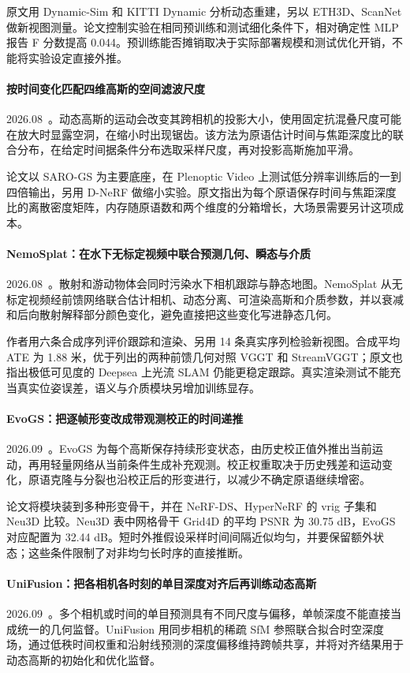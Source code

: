 原文用 Dynamic-Sim 和 KITTI Dynamic 分析动态重建，另以 ETH3D、ScanNet 做新视图测量。论文控制实验在相同预训练和测试细化条件下，相对确定性 MLP 报告 F 分数提高 0.044。预训练能否摊销取决于实际部署规模和测试优化开销，不能将实验设定直接外推。

\paragraph{按时间变化匹配四维高斯的空间滤波尺度}
2026.08~\cite{2608_21828}。动态高斯的运动会改变其跨相机的投影大小，使用固定抗混叠尺度可能在放大时显露空洞，在缩小时出现锯齿。该方法为原语估计时间与焦距深度比的联合分布，在给定时间据条件分布选取采样尺度，再对投影高斯施加平滑。

论文以 SARO-GS 为主要底座，在 Plenoptic Video 上测试低分辨率训练后的一到四倍输出，另用 D-NeRF 做缩小实验。原文指出为每个原语保存时间与焦距深度比的离散密度矩阵，内存随原语数和两个维度的分箱增长，大场景需要另计这项成本。

\paragraph{NemoSplat：在水下无标定视频中联合预测几何、瞬态与介质}
2026.08~\cite{2608_22888}。散射和游动物体会同时污染水下相机跟踪与静态地图。NemoSplat 从无标定视频经前馈网络联合估计相机、动态分离、可渲染高斯和介质参数，并以衰减和后向散射解释部分颜色变化，避免直接把这些变化写进静态几何。

作者用六条合成序列评价跟踪和渲染、另用 14 条真实序列检验新视图。合成平均 ATE 为 1.88 米，优于列出的两种前馈几何对照 VGGT 和 StreamVGGT；原文也指出极低可见度的 Deepsea 上光流 SLAM 仍能更稳定跟踪。真实渲染测试不能充当真实位姿误差，语义与介质模块另增加训练显存。

\paragraph{EvoGS：把逐帧形变改成带观测校正的时间递推}
2026.09~\cite{2609_00994}。EvoGS 为每个高斯保存持续形变状态，由历史校正值外推出当前运动，再用轻量网络从当前条件生成补充观测。校正权重取决于历史残差和运动变化，原语克隆与分裂也沿校正后的形变进行，以减少不确定原语继续增密。

论文将模块装到多种形变骨干，并在 NeRF-DS、HyperNeRF 的 vrig 子集和 Neu3D 比较。Neu3D 表中网格骨干 Grid4D 的平均 PSNR 为 30.75 dB，EvoGS 对应配置为 32.44 dB。短时外推假设采样时间间隔近似均匀，并要保留额外状态；这些条件限制了对非均匀长时序的直接推断。

\paragraph{UniFusion：把各相机各时刻的单目深度对齐后再训练动态高斯}
2026.09~\cite{2609_05888}。多个相机或时间的单目预测具有不同尺度与偏移，单帧深度不能直接当成统一的几何监督。UniFusion 用同步相机的稀疏 SfM 参照联合拟合时空深度场，通过低秩时间权重和沿射线预测的深度偏移维持跨帧共享，并将对齐结果用于动态高斯的初始化和优化监督。

